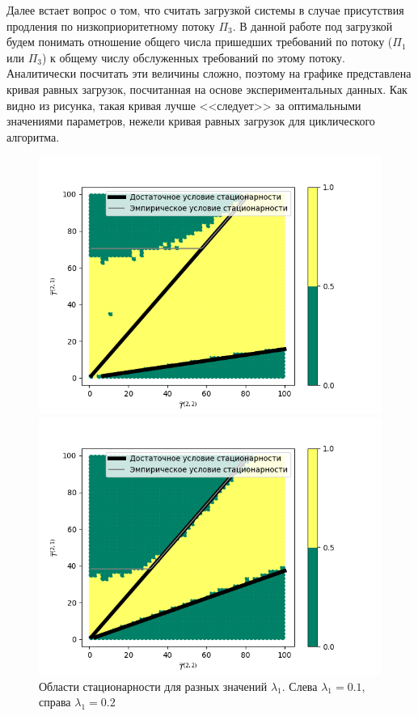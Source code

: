Далее встает вопрос о том, что считать загрузкой системы в случае присутствия продления по низкоприоритетному потоку $\Pi_3$. В данной работе под загрузкой будем понимать отношение общего числа пришедших требований по потоку ($\Pi_1$ или $\Pi_3$) к общему числу обслуженных требований по этому потоку. Аналитически посчитать эти величины сложно, поэтому на графике представлена кривая равных загрузок, посчитанная на основе экспериментальных данных. Как видно из рисунка, такая кривая лучше <<следует>> за оптимальными значениями параметров, нежели кривая равных загрузок для циклического алгоритма.
\begin{figure}
\begin{multicols}{2}
    \includegraphics[width=1.2\linewidth]{Pictures/0_1_thres_10_fact.png}\par 
    \includegraphics[width=1.2\linewidth]{Pictures/0_2_thres_10_fact.png}\par 
    \end{multicols}
\caption{Области стационарности для разных значений $\lambda_1$. Слева $\lambda_1=0.1$, справа $\lambda_1=0.2$}
\label{Experiment:intensities}
\end{figure}

